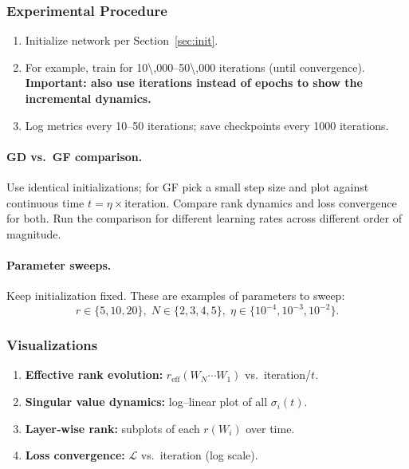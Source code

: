 \documentclass[11pt]{article}
\newcommand{\Wi}{\ensuremath{W_i}}
\newcommand{\Wprod}{\ensuremath{W_N\cdots W_1}}
\begin{document}
\subsubsection*{Experimental Procedure}

\begin{enumerate}[nosep]
  \item Initialize network per Section~\ref{sec:init}.
  \item For example, train for \num{10\,000}–\num{50\,000} iterations (until convergence). \textbf{Important: also use iterations instead of epochs to show the incremental dynamics.}
  \item Log metrics every 10–50 iterations; save checkpoints every 1000 iterations.
\end{enumerate}

\paragraph*{GD vs.\ GF comparison.}
Use identical initializations; for GF pick a small step size and plot against continuous time \(t = \eta \times \text{iteration}\). Compare rank dynamics and loss convergence for both. Run the comparison for different learning rates across different order of magnitude.

\paragraph*{Parameter sweeps.}
Keep initialization fixed. These are examples of parameters to sweep:
\[
  r\!\in\!\{5,10,20\},\;
  N\!\in\!\{2,3,4,5\},\;
  \eta\!\in\!\{10^{-4},10^{-3},10^{-2}\}.
\]

\subsubsection*{Visualizations}

\begin{enumerate}[label=\textbf{\arabic*.},leftmargin=*,nosep]
  \item \textbf{Effective rank evolution:} \(r_{\mathrm{eff}}(\Wprod)\) vs.\ iteration/\(t\).
  \item \textbf{Singular value dynamics:} log–linear plot of all \(\sigma_i(t)\).
  \item \textbf{Layer‐wise rank:} subplots of each \(r(\Wi)\) over time.
  \item \textbf{Loss convergence:} \(\mathcal{L}\) vs.\ iteration (log scale).
\end{enumerate}
\end{document}
